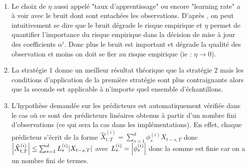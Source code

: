 \documentclass{report}
\begin{document}
\begin{Rque}~\\
\begin{enumerate}
\item 
Le choix de $\eta$ aussi appelé "taux d'apprentissage" ou encore "learning rate" a à voir avec le bruit dont sont entachées les observations. D'après  \citep{giraud-roueff-sanchez-aos2015}, on peut intuitivement se dire que le bruit dégrade le risque empirique et $\eta$ permet de quantifier l'importance du risque empirique dans la décision de mise à jour des coefficients $\alpha^{i}$. Donc plus le bruit est important et dégrade la qualité des observation et moins on doit se fier au risque empirique (ie : $\eta {\rightarrow} 0$).
\item 
La stratégie 1 donne un meilleur résultat théorique que la stratégie 2 mais les conditions d'application de la première stratégie sont plus contraignante alors que la seconde est applicable à n'importe quel ensemble d'échantillons.
\item 
L'hypothèse demandée sur les prédicteurs est automatiquement vérifiée dans le cas où ce sont des prédicteurs linéaires obtenus à partir d'un nombre fini d'observations (ce qui sera la cas dans les implémentations). En effet, chaque prédicteur s'écrit de la forme $\hat{X}_{t,T}^{(i)} = \sum_{s=1}^d \phi_s^{(i)} X_{t-s,T}$ donc ${ \left| \hat{X}_{t,T}^{(i)} \right|} \leq  \sum_{s=1}^d L_s^{(i)} { \left| X_{t-s,T} \right|}$ avec $ L_s^{(i)} = { \left|  \phi_s^{(i)} \right|}$ donc la somme est finie car on a un nombre fini de termes. 
\end{enumerate}
\end{Rque}
\end{document}
